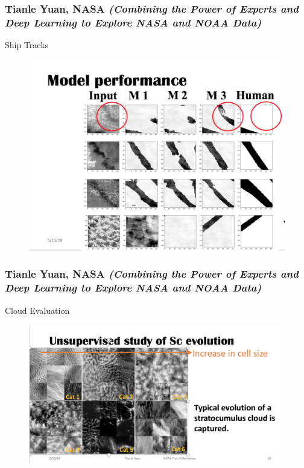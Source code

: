\documentclass{beamer}
\begin{document}
\begin{frame}
\frametitle{Tianle Yuan, NASA \textit{(Combining the Power of Experts and Deep Learning to Explore NASA and NOAA Data)}}
Ship Tracks
\begin{figure}
	\includegraphics[width=.75\linewidth]{figs/ScreenShot_ModelPerformance.png}
\end{figure}
\end{frame}

\begin{frame}
\frametitle{Tianle Yuan, NASA \textit{(Combining the Power of Experts and Deep Learning to Explore NASA and NOAA Data)}}
Cloud Evaluation
\begin{figure}
	\includegraphics[width=.9\linewidth]{figs/ScreenShot_CloudEvaluation.png}
\end{figure}
\end{frame}
\end{document}
